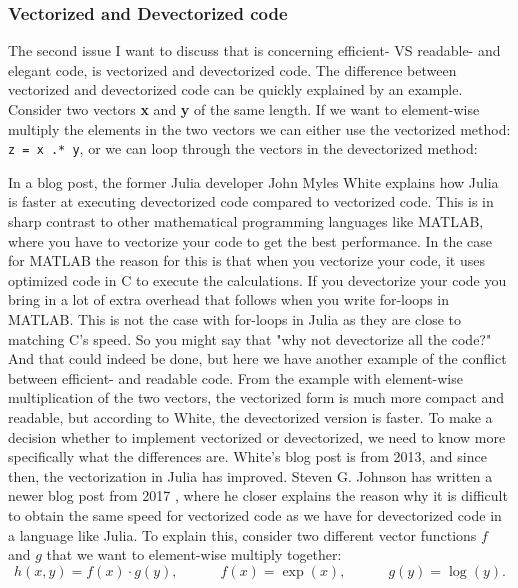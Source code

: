 \subsubsection{Vectorized and Devectorized code}
The second issue I want to discuss that is concerning efficient- VS readable- and elegant code, is vectorized and devectorized code. The difference between vectorized and devectorized code can be quickly explained by an example. Consider two vectors \textbf{x} and \textbf{y} of the same length. If we want to element-wise multiply the elements in the two vectors we can either use the vectorized method: \texttt{z = x .* y}, or we can loop through the vectors in the devectorized method:

In a blog post, the former Julia developer John Myles White explains how Julia is faster at executing devectorized code compared to vectorized code\emph{\citep{Vectorization}}. This is in sharp contrast to other mathematical programming languages like MATLAB, where you have to vectorize your code to get the best performance. In the case for MATLAB the reason for this is that when you vectorize your code, it uses optimized code in C to execute the calculations. If you devectorize your code you bring in a lot of extra overhead that follows when you write for-loops in MATLAB. This is not the case with for-loops in Julia as they are close to matching C's speed. So you might say that "why not devectorize all the code?" And that could indeed be done, but here we have another example of the conflict between efficient- and readable code. From the example with element-wise multiplication of the two vectors, the vectorized form is much more compact and readable, but according to White, the devectorized version is faster. To make a decision whether to implement vectorized or devectorized, we need to know more specifically what the differences are. White's blog post is from 2013, and since then, the vectorization in Julia has improved. Steven G. Johnson has written a newer blog post from 2017 \emph{\citep{MoreDotsJuliaBlog}}, where he closer explains the reason why it is difficult to obtain the same speed for vectorized code as we have for devectorized code in a language like Julia. To explain this, consider two different vector functions $f$ and $g$ that we want to element-wise multiply together:
\begin{equation*}
    h(x,y) = f(x) \cdot g(y), \hspace{3em} f(x) = \exp(x), \hspace{3em} g(y) = \log(y).
\end{equation*}
